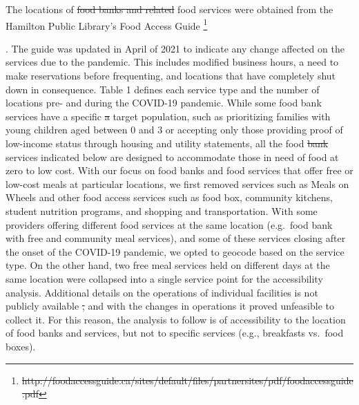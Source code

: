 \documentclass[]{elsarticle} %
\providecommand{\DIFaddtex}[1]{{\protect\color{blue}\uwave{#1}}} %
\providecommand{\DIFdeltex}[1]{{\protect\color{red}\sout{#1}}}                      %
\providecommand{\DIFaddbegin}{} %
\providecommand{\DIFaddend}{} %
\providecommand{\DIFdelbegin}{} %
\providecommand{\DIFdelend}{} %
\providecommand{\DIFadd}[1]{\texorpdfstring{\DIFaddtex{#1}}{#1}} %
\providecommand{\DIFdel}[1]{\texorpdfstring{\DIFdeltex{#1}}{}} %
\newcommand{\DIFscaledelfig}{0.5}
\newlength{\DIFdelgraphicswidth} %
\newlength{\DIFdelgraphicsheight} %
\newcommand{\DIFaddincludegraphics}[2][]{{\color{blue}\fbox{\DIFOincludegraphics[#1]{#2}}}} %
\newcommand{\DIFdelincludegraphics}[2][]{%
\sbox{\DIFdelgraphicsbox}{\DIFOincludegraphics[#1]{#2}}%
\settoboxwidth{\DIFdelgraphicswidth}{\DIFdelgraphicsbox} %
\settoboxtotalheight{\DIFdelgraphicsheight}{\DIFdelgraphicsbox} %
\scalebox{\DIFscaledelfig}{%
\parbox[b]{\DIFdelgraphicswidth}{\usebox{\DIFdelgraphicsbox}\\[-\baselineskip] \rule{\DIFdelgraphicswidth}{0em}}\llap{\resizebox{\DIFdelgraphicswidth}{\DIFdelgraphicsheight}{%
\setlength{\unitlength}{\DIFdelgraphicswidth}%
\begin{picture}(1,1)%
\thicklines\linethickness{2pt} %
{\color[rgb]{1,0,0}\put(0,0){\framebox(1,1){}}}%
{\color[rgb]{1,0,0}\put(0,0){\line( 1,1){1}}}%
{\color[rgb]{1,0,0}\put(0,1){\line(1,-1){1}}}%
\end{picture}%
}\hspace*{3pt}}} %
} %
\DeclareRobustCommand{\DIFaddbegin}{\DIFOaddbegin \let\includegraphics\DIFaddincludegraphics} %
\DeclareRobustCommand{\DIFaddend}{\DIFOaddend \let\includegraphics\DIFOincludegraphics} %
\DeclareRobustCommand{\DIFdelbegin}{\DIFOdelbegin \let\includegraphics\DIFdelincludegraphics} %
\DeclareRobustCommand{\DIFdelend}{\DIFOaddend \let\includegraphics\DIFOincludegraphics} %
\begin{document}
The locations of \DIFdelbegin \DIFdel{food banks and related }\DIFdelend \DIFaddbegin \DIFadd{emergency and community }\DIFaddend food services were obtained
from the Hamilton Public Library's Food Access Guide \DIFdelbegin \footnote{\DIFdel{http://foodaccessguide.ca/sites/default/files/partnersites/pdf/foodaccessguide.pdf}}%
\addtocounter{footnote}{-1}%
\DIFdelend \DIFaddbegin \DIFadd{(HPL, 2021)}\DIFaddend . The
guide was updated in April of 2021 to indicate any change affected on
the services due to the pandemic. This includes modified business hours,
a need to make reservations before frequenting, and locations that have
completely shut down in consequence. Table 1 defines each service type
and the number of locations pre- and during the COVID-19 pandemic. While
some food bank services have a specific \DIFdelbegin \DIFdel{a }\DIFdelend target population, such as
prioritizing families with young children aged between 0 and 3 or
accepting only those providing proof of low-income status through
housing and utility statements, all the food \DIFdelbegin \DIFdel{bank
}\DIFdelend services indicated below
are designed to accommodate those in need of food at zero to low cost.
With our focus on food banks and food services that offer free or
low-cost meals at particular locations, we first removed services such
as Meals on Wheels and other food access services such as food box,
community kitchens, student nutrition programs, and shopping and
transportation. With some providers offering different food services at
the same location (e.g.~food bank with free and community meal
services), and some of these services closing after the onset of the
COVID-19 pandemic, we opted to geocode based on the service type. On the
other hand, two free meal services held on different days at the same
location were collapsed into a single service point for the
accessibility analysis. Additional details on the operations of
individual facilities is not publicly available \DIFdelbegin \DIFdel{, }\DIFdelend and with the changes in
operations it proved unfeasible to collect it. For this reason, the
analysis to follow is of accessibility to the location of food banks and
services, but not to specific services (e.g., breakfasts vs.~food
boxes).
\end{document}
